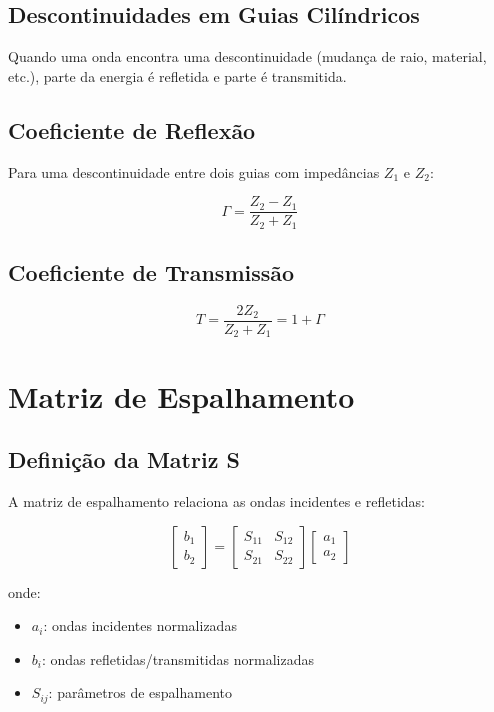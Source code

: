 \documentclass[a4paper,12pt]{article}
\begin{document}
\subsection{Descontinuidades em Guias Cilíndricos}

Quando uma onda encontra uma descontinuidade (mudança de raio, material, etc.), parte da energia é refletida e parte é transmitida.

\subsection{Coeficiente de Reflexão}
Para uma descontinuidade entre dois guias com impedâncias $Z_1$ e $Z_2$:

\begin{equation}
\Gamma = \frac{Z_2 - Z_1}{Z_2 + Z_1}
\end{equation}

\subsection{Coeficiente de Transmissão}
\begin{equation}
T = \frac{2Z_2}{Z_2 + Z_1} = 1 + \Gamma
\end{equation}

\section{Matriz de Espalhamento}

\subsection{Definição da Matriz S}
A matriz de espalhamento relaciona as ondas incidentes e refletidas:

\begin{equation}
\begin{bmatrix}
b_1 \\
b_2
\end{bmatrix} =
\begin{bmatrix}
S_{11} & S_{12} \\
S_{21} & S_{22}
\end{bmatrix}
\begin{bmatrix}
a_1 \\
a_2
\end{bmatrix}
\end{equation}

onde:
\begin{itemize}
    \item $a_i$: ondas incidentes normalizadas
    \item $b_i$: ondas refletidas/transmitidas normalizadas
    \item $S_{ij}$: parâmetros de espalhamento
\end{itemize}
\end{document}
